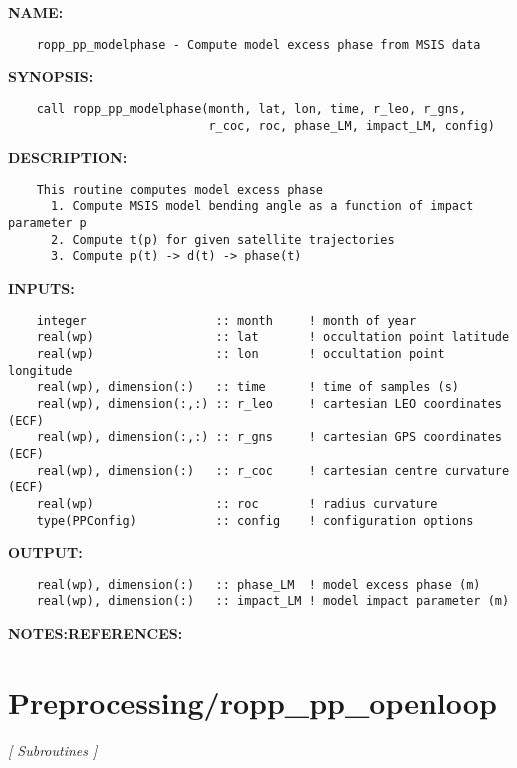\label{ch:robo77}
\label{ch:Preprocessing_ropp_pp_modelphase}
\textbf{NAME:}\hspace{0.08in}\begin{Verbatim}
    ropp_pp_modelphase - Compute model excess phase from MSIS data
\end{Verbatim}
\textbf{SYNOPSIS:}\hspace{0.08in}\begin{Verbatim}
    call ropp_pp_modelphase(month, lat, lon, time, r_leo, r_gns,
                            r_coc, roc, phase_LM, impact_LM, config)
\end{Verbatim}
\textbf{DESCRIPTION:}\hspace{0.08in}\begin{Verbatim}
    This routine computes model excess phase
      1. Compute MSIS model bending angle as a function of impact parameter p
      2. Compute t(p) for given satellite trajectories
      3. Compute p(t) -> d(t) -> phase(t)
\end{Verbatim}
\textbf{INPUTS:}\hspace{0.08in}\begin{Verbatim}
    integer                  :: month     ! month of year
    real(wp)                 :: lat       ! occultation point latitude
    real(wp)                 :: lon       ! occultation point longitude
    real(wp), dimension(:)   :: time      ! time of samples (s)
    real(wp), dimension(:,:) :: r_leo     ! cartesian LEO coordinates (ECF)
    real(wp), dimension(:,:) :: r_gns     ! cartesian GPS coordinates (ECF)
    real(wp), dimension(:)   :: r_coc     ! cartesian centre curvature (ECF)
    real(wp)                 :: roc       ! radius curvature
    type(PPConfig)           :: config    ! configuration options
\end{Verbatim}
\textbf{OUTPUT:}\hspace{0.08in}\begin{Verbatim}
    real(wp), dimension(:)   :: phase_LM  ! model excess phase (m)
    real(wp), dimension(:)   :: impact_LM ! model impact parameter (m)
\end{Verbatim}
\textbf{NOTES:}\hspace{0.08in}\textbf{REFERENCES:}\hspace{0.08in}\section{Preprocessing/ropp\_pp\_openloop}
\textsl{[ Subroutines ]}

